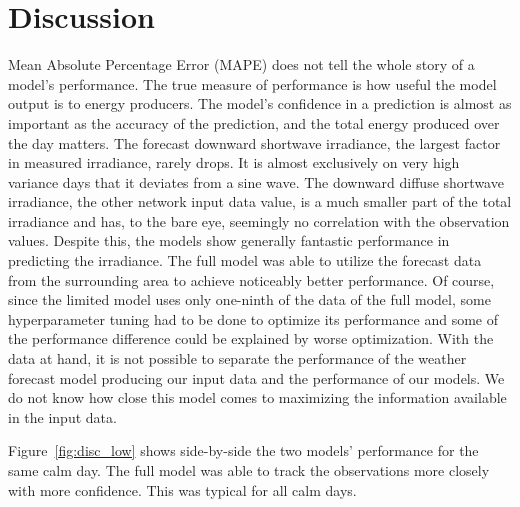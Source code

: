 \chapter{Discussion}
Mean Absolute Percentage Error (MAPE) does not tell the whole story of a model's performance. The true measure of performance is how useful the model output is to energy producers. The model's confidence in a prediction is almost as important as the accuracy of the prediction, and the total energy produced over the day matters.
The forecast downward shortwave irradiance, the largest factor in measured irradiance, rarely drops. It is almost exclusively on very high variance days that it deviates from a sine wave. The downward diffuse shortwave irradiance, the other network input data value, is a much smaller part of the total irradiance and has, to the bare eye, seemingly no correlation with the observation values. Despite this, the models show generally fantastic performance in predicting the irradiance.
The full model was able to utilize the forecast data from the surrounding area to achieve noticeably better performance. Of course, since the limited model uses only one-ninth of the data of the full model, some hyperparameter tuning had to be done to optimize its performance and some of the performance difference could be explained by worse optimization.
With the data at hand, it is not possible to separate the performance of the weather forecast model producing our input data and the performance of our models. We do not know how close this model comes to maximizing the information available in the input data.

Figure~\ref{fig:disc_low} shows side-by-side the two models' performance for the same calm day. The full model was able to track the observations more closely with more confidence. This was typical for all calm days.\\

